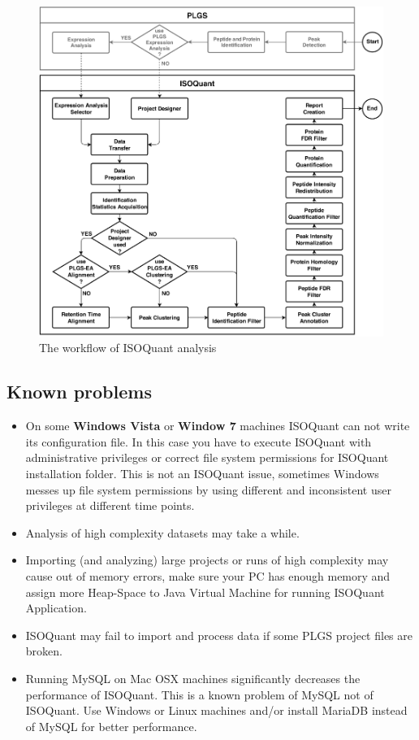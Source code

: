 \documentclass[]{article}
\providecommand{\tightlist}{%
  \setlength{\itemsep}{0pt}\setlength{\parskip}{0pt}}
\begin{document}
\begin{figure}[htbp]
\centering
\includegraphics{pic/isoquant_workflow.png}
\caption{The workflow of ISOQuant analysis \label{pic:iqWorkflow}}
\end{figure}

\clearpage

\subsection{Known problems}\label{known-problems}

\begin{itemize}
\tightlist
\item
  On some \textbf{Windows Vista} or \textbf{Window 7} machines ISOQuant
  can not write its configuration file. In this case you have to execute
  ISOQuant with administrative privileges or correct file system
  permissions for ISOQuant installation folder. This is not an ISOQuant
  issue, sometimes Windows messes up file system permissions by using
  different and inconsistent user privileges at different time points.
\item
  Analysis of high complexity datasets may take a while.
\item
  Importing (and analyzing) large projects or runs of high complexity
  may cause out of memory errors, make sure your PC has enough memory
  and assign more Heap-Space to Java Virtual Machine for running
  ISOQuant Application.
\item
  ISOQuant may fail to import and process data if some PLGS project
  files are broken.
\item
  Running MySQL on Mac OSX machines significantly decreases the
  performance of ISOQuant. This is a known problem of MySQL not of
  ISOQuant. Use Windows or Linux machines and/or install MariaDB instead
  of MySQL for better performance.
\end{itemize}
\end{document}
